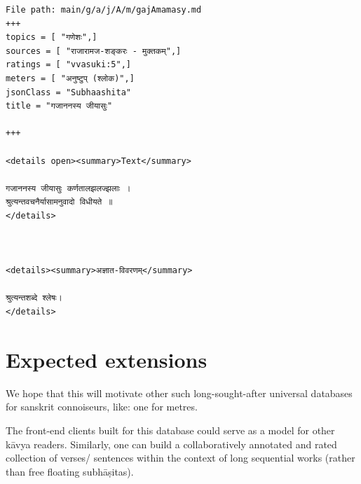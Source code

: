 \documentclass[11pt]{article}
\begin{document}
\begin{verbatim}
File path: main/g/a/j/A/m/gajAmamasy.md
+++
topics = [ "गणेशः",]
sources = [ "राजारामज-शङ्करः - मुक्तकम्",]
ratings = [ "vvasuki:5",]
meters = [ "अनुष्टुप् (श्लोक)",]
jsonClass = "Subhaashita"
title = "गजाननस्य जीयासुः"

+++

<details open><summary>Text</summary>

गजाननस्य जीयासुः कर्णतालझलज्झलाः ।  
श्रुत्यन्तवचनैर्यासामनुवादो विधीयते ॥
</details>



<details><summary>अज्ञात-विवरणम्</summary>

श्रुत्यन्तशब्दे श्लेषः।
</details>
\end{verbatim}

\section{Expected extensions}
We hope that this will motivate other such long-sought-after universal databases for sanskrit connoiseurs, like: one for metres.

The front-end clients built for this database could serve as a model for other kāvya readers. Similarly, one can build a collaboratively annotated and rated collection of verses/ sentences within the context of long sequential works (rather than free floating subhāṣitas).



\end{document}
